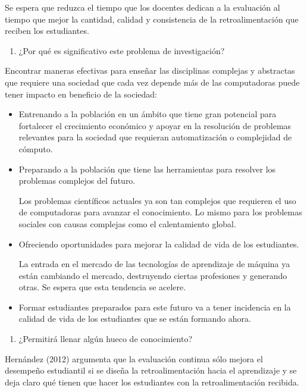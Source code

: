 \documentclass[
  12,
]{scrartcl}
\providecommand{\tightlist}{%
  \setlength{\itemsep}{0pt}\setlength{\parskip}{0pt}}
\begin{document}
Se espera que reduzca el tiempo que los docentes dedican a la evaluación
al tiempo que mejor la cantidad, calidad y consistencia de la
retroalimentación que reciben los estudiantes.

\begin{enumerate}
\def\labelenumi{\arabic{enumi}.}
\setcounter{enumi}{6}
\tightlist
\item
  ¿Por qué es significativo este problema de investigación?
\end{enumerate}

Encontrar maneras efectivas para enseñar las disciplinas complejas y
abstractas que requiere una sociedad que cada vez depende más de las
computadoras puede tener impacto en beneficio de la sociedad:

\begin{itemize}
\item
  Entrenando a la población en un ámbito que tiene gran potencial para
  fortalecer el crecimiento económico y apoyar en la resolución de
  problemas relevantes para la sociedad que requieran automatización o
  complejidad de cómputo.
\item
  Preparando a la población que tiene las herramientas para resolver los
  problemas complejos del futuro.

  Los problemas científicos actuales ya son tan complejos que requieren
  el uso de computadoras para avanzar el conocimiento. Lo mismo para los
  problemas sociales con causas complejas como el calentamiento global.
\item
  Ofreciendo oportunidades para mejorar la calidad de vida de los
  estudiantes.

  La entrada en el mercado de las tecnologías de aprendizaje de máquina
  ya están cambiando el mercado, destruyendo ciertas profesiones y
  generando otras. Se espera que esta tendencia se acelere.
\item
  Formar estudiantes preparados para este futuro va a tener incidencia
  en la calidad de vida de los estudiantes que se están formando ahora.
\end{itemize}

\begin{enumerate}
\def\labelenumi{\arabic{enumi}.}
\setcounter{enumi}{7}
\tightlist
\item
  ¿Permitirá llenar algún hueco de conocimiento?
\end{enumerate}

Hernández (2012) argumenta que la evaluación continua sólo mejora el
desempeño estudiantil si se diseña la retroalimentación hacia el
aprendizaje y se deja claro qué tienen que hacer los estudiantes con la
retroalimentación recibida.
\end{document}
